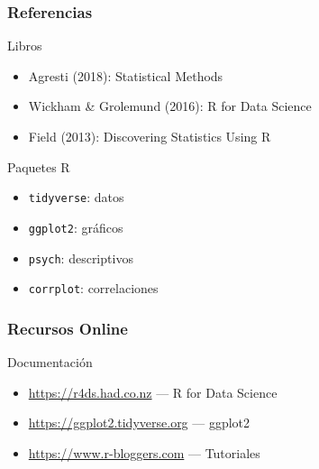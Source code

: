 \documentclass[aspectratio=169,11pt]{beamer}
\begin{document}
\begin{frame}[fragile]
\frametitle{Referencias}
\small

\begin{block}{Libros}
  \begin{itemize}
    \item Agresti (2018): Statistical Methods
    \item Wickham \& Grolemund (2016): R for Data Science
    \item Field (2013): Discovering Statistics Using R
  \end{itemize}
\end{block}

\begin{block}{Paquetes R}
  \begin{itemize}
    \item \texttt{tidyverse}: datos
    \item \texttt{ggplot2}: gráficos
    \item \texttt{psych}: descriptivos
    \item \texttt{corrplot}: correlaciones
  \end{itemize}
\end{block}
\end{frame}

\begin{frame}[fragile]
\frametitle{Recursos Online}
\small

\begin{block}{Documentación}
  \begin{itemize}
    \item \url{https://r4ds.had.co.nz} — R for Data Science
    \item \url{https://ggplot2.tidyverse.org} — ggplot2
    \item \url{https://www.r-bloggers.com} — Tutoriales
  \end{itemize}
\end{block}
\end{frame}
\end{document}
